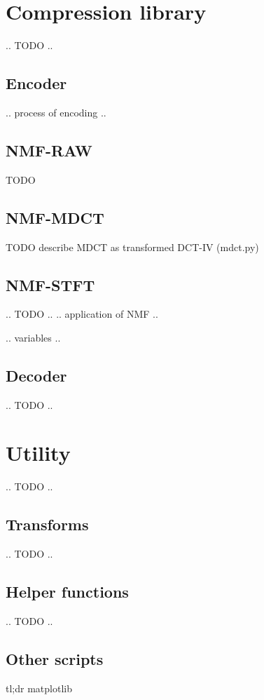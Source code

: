 \section{Compression library}
.. TODO ..

\subsection{Encoder}
.. process of encoding ..

\subsection{NMF-RAW}
TODO

\subsection{NMF-MDCT}
TODO describe MDCT as transformed DCT-IV (mdct.py)

\subsection{NMF-STFT}
.. TODO ..
.. application of NMF ..

.. variables ..

\subsection{Decoder}
.. TODO ..

\section{Utility}
.. TODO ..

\subsection{Transforms}
.. TODO ..

\subsection{Helper functions}
.. TODO ..

\subsection{Other scripts}
tl;dr matplotlib
